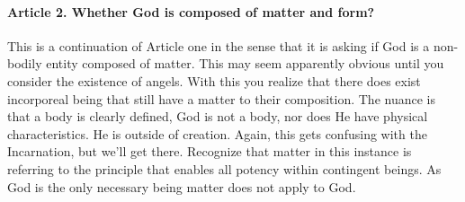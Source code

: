 \documentclass{ucetd}
\begin{document}
\paragraph{Article 2. Whether God is composed of matter and form?}
This is a continuation of Article one in the sense that it is asking if God is a non-bodily entity composed of matter. This may seem apparently obvious until you consider the existence of angels. With this you realize that there does exist incorporeal being that still have a matter to their composition. The nuance is that a body is clearly defined, God is not a body, nor does He have physical characteristics. He is outside of creation. Again, this gets confusing with the Incarnation, but we'll get there. Recognize that matter in this instance is referring to the principle that enables all potency within contingent beings. As God is the only necessary being matter does not apply to God.
\end{document}
